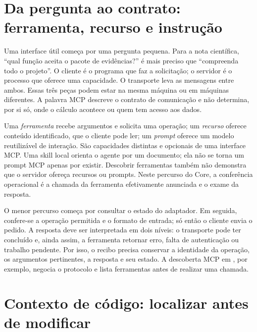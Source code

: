 \section{Da pergunta ao contrato: ferramenta, recurso e instrução}

\begin{descricao}
Uma interface útil começa por uma pergunta pequena. Para a nota científica,
``qual função aceita o pacote de evidências?'' é mais preciso que ``compreenda
todo o projeto''. O cliente é o programa que faz a solicitação; o servidor é o
processo que oferece uma capacidade. O transporte leva as mensagens entre ambos.
Essas três peças podem estar na mesma máquina ou em máquinas diferentes. A
palavra MCP descreve o contrato de comunicação e não determina, por si só,
onde o cálculo acontece ou quem tem acesso aos dados.
\end{descricao}

\begin{conceito}
Uma \emph{ferramenta} recebe argumentos e solicita uma operação; um
\emph{recurso} oferece conteúdo identificado, que o cliente pode ler; um
\emph{prompt} oferece um modelo reutilizável de interação. São capacidades
distintas e opcionais de uma interface MCP. Uma skill local orienta o agente
por um documento; ela não se torna um prompt MCP apenas por existir.
Descobrir ferramentas também não demonstra que o servidor ofereça recursos
ou prompts. Neste percurso do Core, a conferência operacional é a chamada
da ferramenta efetivamente anunciada e o exame da resposta.
\end{conceito}

\begin{metodo}
O menor percurso começa por consultar o estado do adaptador. Em seguida,
confere-se a operação permitida e o formato de entrada; só então o cliente
envia o pedido. A resposta deve ser interpretada em dois níveis: o transporte
pode ter concluído e, ainda assim, a ferramenta retornar erro, falta de
autenticação ou trabalho pendente. Por isso, o recibo precisa conservar a
identidade da operação, os argumentos pertinentes, a resposta e seu estado.
A descoberta MCP em , por exemplo,
negocia o protocolo e lista ferramentas antes de realizar uma chamada.
\end{metodo}

\section{Contexto de código: localizar antes de modificar}

